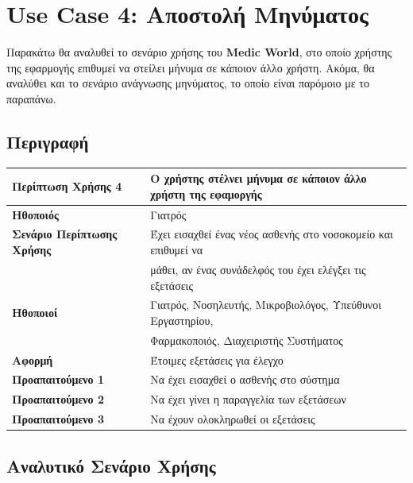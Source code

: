\documentclass{article}
\newcommand\T{\rule{0pt}{2.6ex}}       %
\newcommand\B{\rule[-1.2ex]{0pt}{0pt}}
\begin{document}
\newpage

\section{Use Case 4: Αποστολή Μηνύματος}

Παρακάτω θα αναλυθεί το σενάριο χρήσης του \textbf{Medic World}, στο οποίο χρήστης της εφαρμογής επιθυμεί να στείλει μήνυμα σε κάποιον άλλο χρήστη. Ακόμα, θα αναλύθει και το σενάριο ανάγνωσης μηνύματος, το οποίο είναι παρόμοιο με το παραπάνω.

\subsection{Περιγραφή}

\begin{center}
     \begin{tabular}{|l|l|}
     \hline
      \textbf{Περίπτωση Χρήσης 4} & Ο χρήστης στέλνει μήνυμα σε κάποιον άλλο χρήστη της εφαμοργής \T\B \\ 
      \hline
      \textbf{Ηθοποιός} & Γιατρός \T\B \\
      \hline
      \textbf{Σενάριο Περίπτωσης Χρήσης} & Έχει εισαχθεί ένας νέος ασθενής στο νοσοκομείο και επιθυμεί να \T \\& μάθει, αν ένας συνάδελφός του έχει ελέγξει τις εξετάσεις \B \\
      \hline
      \textbf{Ηθοποιοί} & Γιατρός, Νοσηλευτής, Μικροβιολόγος, Υπεύθυνοι Εργαστηρίου, \T \\& Φαρμακοποιός, Διαχειριστής Συστήματος \T\B \\
      \hline
      \textbf{Αφορμή} & Έτοιμες εξετάσεις για έλεγχο \T\B \\
      \hline
      \textbf{Προαπαιτούμενο 1} & Να έχει εισαχθεί ο ασθενής στο σύστημα \T\B \\
      \hline
      \textbf{Προαπαιτούμενο 2} & Να έχει γίνει η παραγγελία των εξετάσεων \T\B \\
      \hline
      \textbf{Προαπαιτούμενο 3} & Να έχουν ολοκληρωθεί οι εξετάσεις \T\B \\
      \hline
     \end{tabular}
 \end{center}
 
 \subsection{Αναλυτικό Σενάριο Χρήσης}
\end{document}
